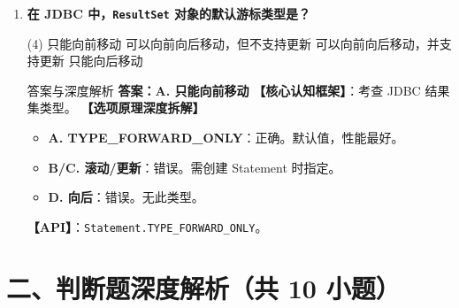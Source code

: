 \documentclass[12pt, a4paper]{ctexart}
\newcommand{\code}[1]{\texttt{#1}}
\begin{document}
\begin{enumerate}[label=\textbf{\arabic*.}, itemsep=1em]
    \item \textbf{在 JDBC 中，\code{ResultSet} 对象的默认游标类型是？}
    \begin{tasks}(4)
        \task 只能向前移动 \task 可以向前向后移动，但不支持更新
        \task 可以向前向后移动，并支持更新 \task 只能向后移动
    \end{tasks}
    \begin{bluebox}{答案与深度解析}
    \textbf{答案：A. 只能向前移动}
    \textbf{【核心认知框架】}：考查 JDBC 结果集类型。
    \textbf{【选项原理深度拆解】}
    \begin{itemize}[leftmargin=*, nosep]
        \item \textbf{A. TYPE\_FORWARD\_ONLY}：正确。默认值，性能最好。
        \item \textbf{B/C. 滚动/更新}：错误。需创建 Statement 时指定。
        \item \textbf{D. 向后}：错误。无此类型。
    \end{itemize}
    \textbf{【API】}：\code{Statement.TYPE\_FORWARD\_ONLY}。
    \end{bluebox}
\end{enumerate}

\section*{二、判断题深度解析（共 10 小题）}
\end{document}
